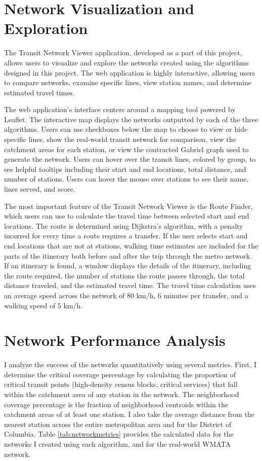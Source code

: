 \documentclass[manuscript,nonacm]{acmart}
\begin{document}
\section{Network Visualization and Exploration}

The Transit Network Viewer application, developed as a part of this project, allows users to visualize and explore the networks created using the algorithms designed in this project. The web application is highly interactive, allowing users to compare networks, examine specific lines, view station names, and determine estimated travel times. 

The web application's interface centers around a mapping tool powered by Leaflet. The interactive map displays the networks outputted by each of the three algorithms. Users can use checkboxes below the map to choose to view or hide specific lines, show the real-world transit network for comparison, view the catchment areas for each station, or view the contracted Gabriel graph used to generate the network. Users can hover over the transit lines, colored by group, to see helpful tooltips including their start and end locations, total distance, and number of stations. Users can hover the mouse over stations to see their name, lines served, and score. 

The most important feature of the Transit Network Viewer is the Route Finder, which users can use to calculate the travel time between selected start and end locations. The route is determined using Dijkstra's algorithm, with a penalty incurred for every time a route requires a transfer. If the user selects start and end locations that are not at stations, walking time estimates are included for the parts of the itinerary both before and after the trip through the metro network. If an itinerary is found, a window displays the details of the itinerary, including the route required, the number of stations the route passes through, the total distance traveled, and the estimated travel time. The travel time calculation uses an average speed across the network of 80 km/h, 6 minutes per transfer, and a walking speed of 5 km/h. 

\section{Network Performance Analysis}

I analyze the success of the networks quantitatively using several metrics. First, I determine the critical coverage percentage by calculating the proportion of critical transit points (high-density census blocks, critical services) that fall within the catchment area of any station in the network. The neighborhood coverage percentage is the fraction of neighborhood centroids within the catchment areas of at least one station. I also take the average distance from the nearest station across the entire metropolitan area and for the District of Columbia. Table \ref{tab:networkmetrics} provides the calculated data for the networks I created using each algorithm, and for the real-world WMATA network.
\end{document}
